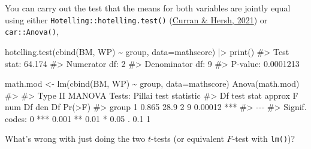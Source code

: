 \documentclass[
  letterpaper,
  10pt,
  krantz2]{krantz}
\makeatletter
\newenvironment{Shaded}{\begin{snugshade}}{\end{snugshade}}
\newcommand{\AttributeTok}[1]{\textcolor[rgb]{0.40,0.45,0.13}{#1}}
\newcommand{\CommentTok}[1]{\textcolor[rgb]{0.37,0.37,0.37}{#1}}
\newcommand{\FunctionTok}[1]{\textcolor[rgb]{0.28,0.35,0.67}{#1}}
\newcommand{\NormalTok}[1]{\textcolor[rgb]{0.00,0.23,0.31}{#1}}
\newcommand{\OtherTok}[1]{\textcolor[rgb]{0.00,0.23,0.31}{#1}}
\newcommand{\SpecialCharTok}[1]{\textcolor[rgb]{0.37,0.37,0.37}{#1}}
\newenvironment{kframe}{%
  \medskip{}
  \setlength{\fboxsep}{.8em}
  \def\at@end@of@kframe{}%
  \ifinner\ifhmode%
  \def\at@end@of@kframe{\end{minipage}}%
  \begin{minipage}{\columnwidth}%
  \fi\fi%
  \def\FrameCommand##1{\hskip\@totalleftmargin \hskip-\fboxsep
  \colorbox{shadecolor}{##1}\hskip-\fboxsep
      \hskip-\linewidth \hskip-\@totalleftmargin \hskip\columnwidth}%
  \MakeFramed {\advance\hsize-\width
    \@totalleftmargin\z@ \linewidth\hsize
    \@setminipage}}%
{\par\unskip\endMakeFramed%
  \at@end@of@kframe}
\renewenvironment{Shaded}{\begin{kframe}}{\end{kframe}}
\makeatother
\begin{document}
You can carry out the test that the means for both variables are jointly
equal using either \texttt{Hotelling::hotelling.test()}
(\protect\hyperlink{ref-R-Hotelling}{Curran \& Hersh, 2021}) or
\texttt{car::Anova()},

\begin{Shaded}
\begin{Highlighting}[]
\FunctionTok{hotelling.test}\NormalTok{(}\FunctionTok{cbind}\NormalTok{(BM, WP) }\SpecialCharTok{\textasciitilde{}}\NormalTok{ group, }\AttributeTok{data=}\NormalTok{mathscore) }\SpecialCharTok{|\textgreater{}} \FunctionTok{print}\NormalTok{()}
\CommentTok{\#\textgreater{} Test stat:  64.174 }
\CommentTok{\#\textgreater{} Numerator df:  2 }
\CommentTok{\#\textgreater{} Denominator df:  9 }
\CommentTok{\#\textgreater{} P{-}value:  0.0001213}

\NormalTok{math.mod }\OtherTok{\textless{}{-}} \FunctionTok{lm}\NormalTok{(}\FunctionTok{cbind}\NormalTok{(BM, WP) }\SpecialCharTok{\textasciitilde{}}\NormalTok{ group, }\AttributeTok{data=}\NormalTok{mathscore)}
\FunctionTok{Anova}\NormalTok{(math.mod)}
\CommentTok{\#\textgreater{} }
\CommentTok{\#\textgreater{} Type II MANOVA Tests: Pillai test statistic}
\CommentTok{\#\textgreater{}       Df test stat approx F num Df den Df  Pr(\textgreater{}F)    }
\CommentTok{\#\textgreater{} group  1     0.865     28.9      2      9 0.00012 ***}
\CommentTok{\#\textgreater{} {-}{-}{-}}
\CommentTok{\#\textgreater{} Signif. codes:  0 \textquotesingle{}***\textquotesingle{} 0.001 \textquotesingle{}**\textquotesingle{} 0.01 \textquotesingle{}*\textquotesingle{} 0.05 \textquotesingle{}.\textquotesingle{} 0.1 \textquotesingle{} \textquotesingle{} 1}
\end{Highlighting}
\end{Shaded}

What's wrong with just doing the two \(t\)-tests (or equivalent
\(F\)-test with \texttt{lm()})?
\end{document}
